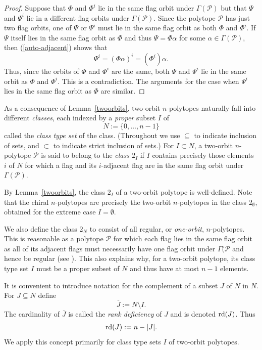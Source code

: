 \documentclass[12pt]{article}
\renewcommand{\bar}{\overline}
\renewcommand{\>}{\rangle}
\theoremstyle{definition}\newtheorem{definition}{Definition}[section]
\begin{document}
\begin{proof}
Suppose that $\Phi$ and $\Phi^i$ lie in the same flag orbit under $\Gamma(\mathcal{P})$ but that $\Psi$ and $\Psi^i$ lie in a different flag orbits under $\Gamma(\mathcal{P})$. Since the polytope $\mathcal{P}$ has just two flag orbits, one of $\Psi$ or $\Psi^i$ must lie in the same flag orbit as both $\Phi$ and $\Phi^i$. If $\Psi$ itself lies in the same flag orbit as $\Phi$ and thus $\Psi=\Phi\alpha$ for some $\alpha\in\Gamma(\mathcal{P})$, then (\ref{auto-adjacent}) shows that  
\[ \Psi^{i} = (\Phi\alpha)^{i}= (\Phi^{i})\alpha.\]
Thus, since the orbits of $\Phi$ and $\Phi^i$ are the same, both $\Psi$ and $\Psi^i$ lie in the same orbit as $\Phi$ and $\Phi^i$. This is a contradiction. The arguments for the case when $\Psi^i$ lies in the same flag orbit as $\Phi$ are similar.
\end{proof}

As a consequence of Lemma~\ref{twoorbits}, two-orbit $n$-polytopes naturally fall into different {\em classes\/}, each indexed by a {\em proper\/} subset $I$ of 
\[ N:=\{0, \dots, n-1\}  \]
called the {\it class type set\/} of the class.
(Throughout we use $\subseteq$ to indicate inclusion of sets, and $\subset$ to indicate strict inclusion of sets.) For $I\subset N$, a two-orbit $n$-polytope $\mathcal{P}$ is said to belong to the {\em class $2_I$} if $I$ contains precisely those elements $i$ of $N$ for which a flag and its $i$-adjacent flag are in the same flag orbit under $\Gamma(\mathcal{P})$.

By Lemma~\ref{twoorbits}, the class $2_I$ of a two-orbit polytope is well-defined. Note that the chiral $n$-polytopes are precisely the two-orbit $n$-polytopes in the class $2_{\emptyset}$, obtained for the extreme case $I = \emptyset$.

We also define the class $2_N$ to consist of all regular, or {\em one-orbit\/}, $n$-polytopes. This is reasonable as a polytope $\mathcal{P}$ for which each flag lies in the same flag orbit as all of its adjacent flags must necessarily have one flag orbit under $\Gamma(\mathcal{P}$ and hence be regular (see \cite[Prop. 2B4]{MS2002}). This also explains why, for a two-orbit polytope, its class type set $I$ must be a proper subset of $N$ and thus have at most $n-1$ elements. 

It is convenient to introduce notation for the complement of a subset $J$ of $N$ in $N$. For $J\subseteq N$ define 
\[\bar{J}:=N \setminus I.\]
The cardinality of $\bar{J}$ is called the {\it rank deficiency} of $J$ and is denoted ${\rm rd}(J)$. Thus
\[ {\rm rd}(J) := n- |J|.\]
We apply this concept primarily for class type sets $I$ of two-orbit polytopes.
\end{document}
